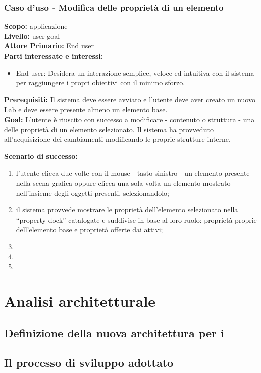 \begin{flushleft}
\begin{boxedminipage}{\textwidth}

\subsubsection*{Caso d'uso - Modifica delle proprietà di un elemento}

\textbf{Scopo:} applicazione \visualnetkit{} \\
\textbf{Livello:} user goal \\
\textbf{Attore Primario:} End user \\
\textbf{Parti interessate e interessi:}
\begin{itemize}
\item End user: Desidera un interazione semplice, veloce ed intuitiva con il sistema per raggiungere i propri obiettivi con il minimo sforzo.
\end{itemize}

\textbf{Prerequisiti:} Il sistema deve essere avviato e l'utente deve aver creato un nuovo Lab e deve essere presente almeno un elemento base. \\
\textbf{Goal:} L'utente è riuscito con successo a modificare - contenuto o struttura - una delle proprietà di un elemento selezionato. Il sistema ha provveduto all'acquisizione dei cambiamenti modificando le proprie strutture interne.

\textbf{Scenario di successo:}
\begin{enumerate}
\item l'utente clicca due volte con il mouse - tasto sinistro - un elemento presente nella scena grafica oppure clicca una sola volta un elemento mostrato nell'insieme degli oggetti presenti, selezionandolo;
\item il sistema provvede mostrare le proprietà dell'elemento selezionato nella ``property dock'' catalogate e suddivise in base al loro ruolo: proprietà proprie dell'elemento base e proprietà offerte dai \plugin{} attivi;
\item 
\item 
\item 
\end{enumerate}

\end{boxedminipage}
\end{flushleft}


\section{Analisi architetturale}

\subsection{Definizione della nuova architettura per i \plugin{}}

\subsection{Il processo di sviluppo adottato}

